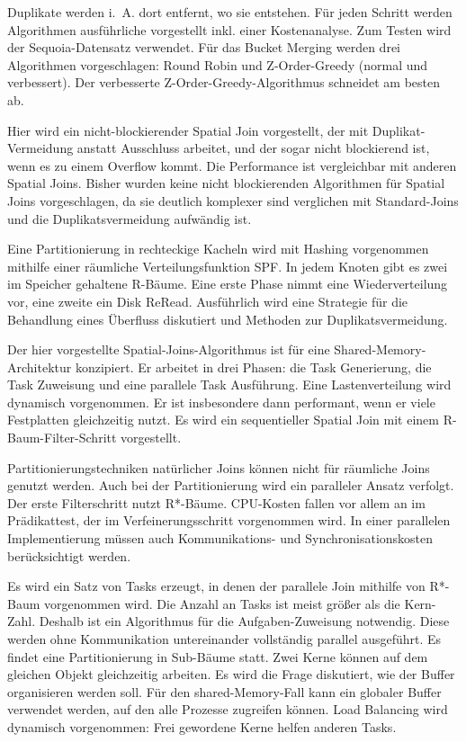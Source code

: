 \documentclass[a4paper,12pt,twoside]{article}
\begin{document}
	  Duplikate werden i.~A. dort entfernt, wo sie entstehen. Für jeden Schritt werden Algorithmen ausführliche vorgestellt inkl. einer Kostenanalyse. Zum Testen wird der Sequoia-Datensatz verwendet. Für das Bucket Merging  werden drei Algorithmen vorgeschlagen: Round Robin und Z-Order-Greedy (normal und verbessert). Der verbesserte Z-Order-Greedy-Algorithmus schneidet am besten ab. 

\textbf{}

Hier wird ein nicht-blockierender Spatial Join vorgestellt, der mit Duplikat-Vermeidung anstatt Ausschluss arbeitet, und der sogar nicht blockierend ist, wenn es zu einem Overflow kommt. Die Performance ist vergleichbar mit anderen Spatial Joins. Bisher wurden keine nicht blockierenden Algorithmen für Spatial Joins vorgeschlagen, da sie deutlich komplexer sind verglichen mit Standard-Joins und die Duplikatsvermeidung aufwändig ist.

Eine Partitionierung in rechteckige Kacheln wird mit Hashing vorgenommen mithilfe einer räumliche Verteilungsfunktion SPF. In jedem Knoten gibt es zwei im Speicher gehaltene R-Bäume. Eine erste Phase nimmt eine Wiederverteilung vor, eine zweite ein Disk ReRead. Ausführlich wird eine Strategie für die Behandlung eines Überfluss diskutiert und Methoden zur Duplikatsvermeidung. 

\textbf{}

Der hier vorgestellte Spatial-Joins-Algorithmus ist für eine Shared-Memory-Architektur konzipiert. Er arbeitet in drei Phasen: die Task Generierung, die Task Zuweisung und eine parallele Task Ausführung. Eine Lastenverteilung wird dynamisch vorgenommen. Er ist insbesondere dann performant, wenn er viele Festplatten gleichzeitig nutzt. Es wird ein sequentieller Spatial Join mit einem R-Baum-Filter-Schritt vorgestellt.

Partitionierungstechniken natürlicher Joins können nicht für räumliche Joins genutzt werden. Auch bei der Partitionierung wird ein paralleler Ansatz verfolgt. Der erste Filterschritt nutzt R*-Bäume. CPU-Kosten fallen vor allem an im Prädikattest, der im Verfeinerungsschritt vorgenommen wird. In einer parallelen Implementierung müssen auch Kommunikations- und Synchronisationskosten berücksichtigt werden. 

Es wird ein Satz von Tasks erzeugt, in denen der parallele Join mithilfe von R*-Baum vorgenommen wird. Die Anzahl an Tasks ist meist größer als die Kern-Zahl. Deshalb ist ein Algorithmus für die Aufgaben-Zuweisung notwendig. Diese werden ohne Kommunikation untereinander vollständig parallel ausgeführt. Es findet eine Partitionierung in Sub-Bäume statt. Zwei Kerne können auf dem gleichen Objekt gleichzeitig arbeiten. Es wird die Frage diskutiert, wie der Buffer organisieren werden soll. Für den shared-Memory-Fall kann ein globaler Buffer verwendet werden, auf den alle Prozesse zugreifen können. Load Balancing wird dynamisch vorgenommen: Frei gewordene Kerne helfen anderen Tasks.
\end{document}
